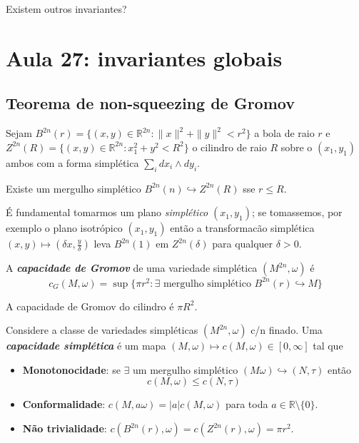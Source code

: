 \begin{question}\leavevmode
	Existem outros invariantes?
\end{question}


\section{Aula 27: invariantes globais}

\subsection{Teorema de non-squeezing de Gromov}


\begin{thm}\leavevmode
	Sejam $B^{2n}(r)=\{(x,y)\in\mathbb{R}^{2n}:\|x\|^2+\|y\|^2<r^2\}$ a bola de raio $r$ e $Z^{2n}(R)=\{(x,y)\in\mathbb{R}^{2n}:x_1^2+y^2<R^2\}$ o cilindro de raio $R$ sobre o $(x_1,y_1)$ ambos com a forma simplética $\sum_{i} dx_i\wedge dy_i$.

	Existe um mergulho simplético $B^{2n}(n)\hookrightarrow  Z^{2n}(R)$ sse $r\leq R$.
\end{thm}

\begin{remark}\leavevmode
É fundamental tomarmos um plano \textit{simplético} $( x_1,y_1)$; se tomassemos, por exemplo o plano isotrópico $(x_1,y_1)$ então a transformacão simplética $(x,y)\mapsto \left(\delta x, \frac{y}{\delta}\right)$ leva $B^{2n}(1)$ em $Z^{2n}(\delta)$ para qualquer $\delta>0$.
\end{remark}

\begin{defn}\leavevmode
	A \textit{\textbf{capacidade de Gromov}} de uma variedade simplética $(M^{2n},\omega)$ é
	\[c_G(M,\omega)=\operatorname{sup}\{\pi r^2:\exists \text{ mergulho simplético } B^{2n}(r)\hookrightarrow  M\}\]
\end{defn}

\begin{thm}\leavevmode
A capacidade de Gromov do cilindro é $\pi R^2$.
\end{thm}

\begin{defn}\leavevmode
	Considere a classe de variedades simpléticas $(M^{2n},\omega)$ c/n finado. Uma \textit{\textbf{capacidade simplética}} é um mapa $(M,\omega)\mapsto c(M,\omega)\in [0,\infty]$ tal que
\begin{itemize}
\item \textbf{Monotonocidade}: se $\exists $ um mergulho simplético $(M\omega)\hookrightarrow (N,\tau)$ então
	 \[c(M,\omega)\leq c(N,\tau)\]
\item \textbf{Conformalidade}: $c(M,a\omega)=|a|c(M,\omega)$ para toda $a \in \mathbb{R}\setminus\{0\}$.
\item \textbf{Não trivialidade}: $c(B^{2n}(r),\omega)=c(Z^{2n}(r),\omega)=\pi r^2$.
\end{itemize}
\end{defn}


